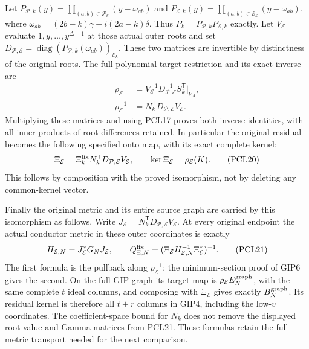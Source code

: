 \documentclass[11pt,a4paper]{article}
\begin{document}
Let
$P_{\mathcal P,k}(y)=\prod_{(a,b)\in\mathcal P_k}(y-\omega_{ab})$
and $P_{\mathcal E,k}(y)=\prod_{(a,b)\in\mathcal E_k}(y-\omega_{ab})$,
where $\omega_{ab}=(2b-k)\gamma-i(2a-k)\delta$. Thus
$P_k=P_{\mathcal P,k}P_{\mathcal E,k}$ exactly. Let
$V_{\mathcal E}$ evaluate $1,y,\ldots,y^{\Delta-1}$ at those
actual outer roots and set
$D_{\mathcal P,\mathcal E}=\operatorname{diag}
(P_{\mathcal P,k}(\omega_{ab}))_{\mathcal E_k}$. These two matrices
are invertible by distinctness of the original roots. The full
polynomial-target restriction and its exact inverse are
\[
 \begin{split}
 \rho_{\mathcal E}
 &=V_{\mathcal E}^{-1}D_{\mathcal P,\mathcal E}^{-1}
                         S_k^{\mathsf T}|_{V_A},\\
 \rho_{\mathcal E}^{-1}
 &=N_k^{\mathsf T}D_{\mathcal P,\mathcal E}V_{\mathcal E}.
 \end{split}\tag{PCL19}
\]
Multiplying these matrices and using PCL17 proves both inverse
identities, with all inner products of root differences retained.
In particular the original residual becomes the following
specified onto map, with its exact complete kernel:
\[
 \Xi_{\mathcal E}=\Xi_k^{\rm fix}
       N_k^{\mathsf T}D_{\mathcal P,\mathcal E}V_{\mathcal E},
 \qquad\ker\Xi_{\mathcal E}=\rho_{\mathcal E}(K).
 \tag{PCL20}
\]
This follows by composition with the proved isomorphism, not by
deleting any common-kernel vector.

Finally the original metric and its entire source graph are carried
by this isomorphism as follows. Write
$J_{\mathcal E}=N_k^{\mathsf T}D_{\mathcal P,\mathcal E}V_{\mathcal E}$.
At every original endpoint the actual conductor metric in these
outer coordinates is exactly
\[
 H_{\mathcal E,N}=J_{\mathcal E}^*G_NJ_{\mathcal E},\qquad
 Q_{\Xi,N}^{\rm fix}
     =(\Xi_{\mathcal E}H_{\mathcal E,N}^{-1}
                      \Xi_{\mathcal E}^*)^{-1}.
 \tag{PCL21}
\]
The first formula is the pullback along $\rho_{\mathcal E}^{-1}$;
the minimum-section proof of GIP6 gives the second. On the full
GIP graph its target map is
$\rho_{\mathcal E}E_N^{\rm graph}$, with the same complete
$t$ ideal columns, and composing with $\Xi_{\mathcal E}$ gives
exactly $B_N^{\rm graph}$. Its residual kernel is therefore all
$t+r$ columns in GIP4, including the low-$v$ coordinates.
The coefficient-space bound for $N_k$ does not remove the displayed
root-value and Gamma matrices from PCL21. These formulas retain
the full metric transport needed for the next comparison.
\end{document}
